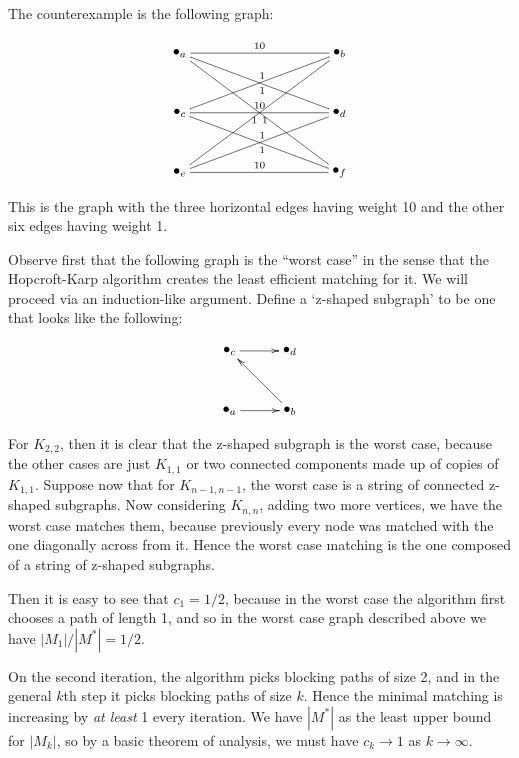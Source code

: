 \documentclass{article}
\newcommand{\problem}[1]{\noindent {\bf #1}}
\begin{document}
\problem{Problem 1.} The counterexample is the following graph:

\begin{displaymath}
\xygraph{
!{<0cm,0cm>;<1cm,0cm>:<0cm,1cm>::}
!{(-4,3) }*+{\bullet_{a}}="a"
!{(0,3)}*+{\bullet_{b}}="b"
!{(-4,1.5) }*+{\bullet_{c}}="c"
!{(0,1.5) }*+{\bullet_{d}}="d"
!{(-4,0) }*+{\bullet_{e}}="e"
!{(0,0)}*+{\bullet_{f}}="f"
"a"-"b" ^ {10} "a"-"d" ^ {1} "a"-"f" _ {1}
"c"-"b" _ {1} "c"-"d" ^ {10} "c"-"f" ^ {1}
"e"-"b" _ {1} "e"-"d" _ {1} "e"-"f" ^ {10}
}
\end{displaymath}

This is the graph with the three horizontal edges having weight 10 and the other six edges having weight 1. 

\problem{Problem 2.} Observe first that the following graph is the ``worst case'' in the sense that the Hopcroft-Karp algorithm creates the least efficient matching for it. We will proceed via an induction-like argument. Define a `z-shaped subgraph' to be one that looks like the following:

\begin{displaymath}
\xygraph{
!{<0cm,0cm>;<1cm,0cm>:<0cm,1cm>::}
!{(0,0) }*+{\bullet_{a}}="a"
!{(1.5,0) }*+{\bullet_{b}}="b"
!{(0,1.5) }*+{\bullet_{c}}="c"
!{(1.5,1.5)}*+{\bullet_{d}}="d"
"a":"b"
"b":"c"
"c":"d"
}
\end{displaymath}

For $K_{2,2}$, then it is clear that the z-shaped subgraph is the worst case, because the other cases are just $K_{1,1}$ or two connected components made up of copies of $K_{1,1}$. Suppose now that for $K_{n-1,n-1}$, the worst case is a string of connected z-shaped subgraphs. Now considering $K_{n,n}$, adding two more vertices, we have the worst case matches them, because previously every node was matched with the one diagonally across from it. Hence the worst case matching is the one composed of a string of z-shaped subgraphs.

Then it is easy to see that $c_1=1/2$, because in the worst case the algorithm first chooses a path of length 1, and so in the worst case graph described above we have $|M_1|/|M^{\ast}|=1/2$.



On the second iteration, the algorithm picks blocking paths of size 2, and in the general $k$th step it picks blocking paths of size $k$. Hence the minimal matching is increasing by \emph{at least} 1 every iteration. We have $|M^{\ast}|$ as the least upper bound for $|M_k|$, so by a basic theorem of analysis, we must have $c_k\to 1$ as $k\to\infty$.
\end{document}
